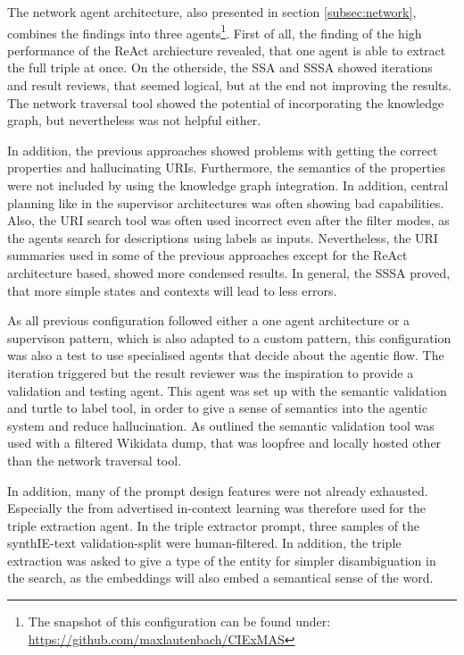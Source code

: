 \documentclass[a4paper,oneside,bibliography=totoc]{scrbook}
\begin{document}
The network agent architecture, also presented in section \ref{subsec:network}, combines the findings into three agents\footnote{The snapshot of this configuration can be found under: \url{https://github.com/maxlautenbach/CIExMAS}}. First of all, the finding of the high performance of the ReAct archiecture revealed, that one agent is able to extract the full triple at once. On the otherside, the \ac{SSA} and \ac{SSSA} showed iterations and result reviews, that seemed logical, but at the end not improving the results. The network traversal tool showed the potential of incorporating the knowledge graph, but nevertheless was not helpful either.

In addition, the previous approaches showed problems with getting the correct properties and hallucinating URIs. Furthermore, the semantics of the properties were not included by using the knowledge graph integration. In addition, central planning like in the supervisor architectures was often showing bad capabilities. Also, the URI search tool was often used incorrect even after the filter modes, as the agents search for descriptions using labels as inputs. Nevertheless, the URI summaries used in some of the previous approaches except for the ReAct architecture based, showed more condensed results. In general, the \ac{SSSA} proved, that more simple states and contexts will lead to less errors.

As all previous configuration followed either a one agent architecture or a supervison pattern, which is also adapted to a custom pattern, this configuration was also a test to use specialised agents that decide about the agentic flow. The iteration triggered but the result reviewer was the inspiration to provide a validation and testing agent. This agent was set up with the semantic validation and turtle to label tool, in order to give a sense of semantics into the agentic system and reduce hallucination. As outlined the semantic validation tool was used with a filtered Wikidata dump, that was loopfree and locally hosted other than the network traversal tool.

In addition, many of the prompt design features were not already exhausted. Especially the from \citet{Brown2020} advertised in-context learning was therefore used for the triple extraction agent. In the triple extractor prompt, three samples of the synthIE-text validation-split were human-filtered. In addition, the triple extraction was asked to give a type of the entity for simpler disambiguation in the search, as the embeddings will also embed a semantical sense of the word.
\end{document}
